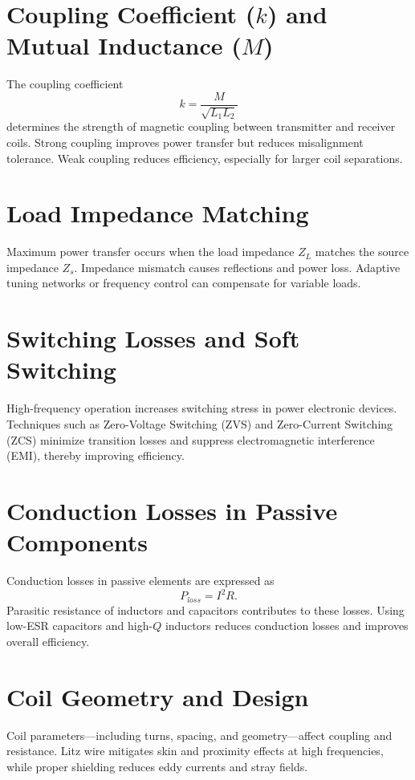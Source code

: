 \documentclass[12pt,a4paper]{report}
\begin{document}
\section{Coupling Coefficient (\(k\)) and Mutual Inductance (\(M\))}  
The coupling coefficient 
\[
k = \frac{M}{\sqrt{L_1 L_2}}
\] 
determines the strength of magnetic coupling between transmitter and receiver coils. Strong coupling improves power transfer but reduces misalignment tolerance. Weak coupling reduces efficiency, especially for larger coil separations.

\section{Load Impedance Matching}  
Maximum power transfer occurs when the load impedance \(Z_L\) matches the source impedance \(Z_s\). Impedance mismatch causes reflections and power loss. Adaptive tuning networks or frequency control can compensate for variable loads.\cite{erickson2020resonant}\cite{bertolini2021frequency}

\section{Switching Losses and Soft Switching}  
High-frequency operation increases switching stress in power electronic devices. Techniques such as Zero-Voltage Switching (ZVS) and Zero-Current Switching (ZCS) minimize transition losses and suppress electromagnetic interference (EMI), thereby improving efficiency.\cite{irivennela2020wireless}

\section{Conduction Losses in Passive Components}  
Conduction losses in passive elements are expressed as 
\[
P_{loss} = I^2 R.
\] 
Parasitic resistance of inductors and capacitors contributes to these losses. Using low-ESR capacitors and high-\(Q\) inductors reduces conduction losses and improves overall efficiency.

\section{Coil Geometry and Design}  
Coil parameters—including turns, spacing, and geometry—affect coupling and resistance. Litz wire mitigates skin and proximity effects at high frequencies, while proper shielding reduces eddy currents and stray fields.
\end{document}
